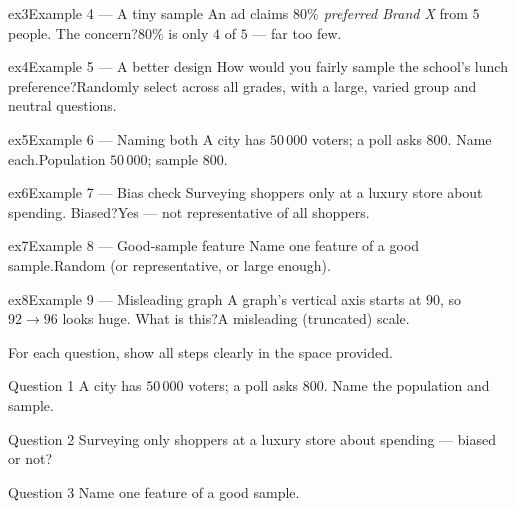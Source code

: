 \documentclass[11pt]{article}
\begin{document}
\begin{example}{ex3}{Example 4 --- A tiny sample}
An ad claims \emph{$80\%$ preferred Brand X} from $5$ people. The concern?\soln $80\%$ is only $4$ of $5$ — far too few.
\end{example}

\begin{example}{ex4}{Example 5 --- A better design}
How would you fairly sample the school's lunch preference?\soln Randomly select across all grades, with a large, varied group and neutral questions.
\end{example}

\begin{example}{ex5}{Example 6 --- Naming both}
A city has $50\,000$ voters; a poll asks $800$. Name each.\soln Population $50\,000$; sample $800$.
\end{example}

\begin{example}{ex6}{Example 7 --- Bias check}
Surveying shoppers only at a luxury store about spending. Biased?\soln Yes — not representative of all shoppers.
\end{example}

\begin{example}{ex7}{Example 8 --- Good-sample feature}
Name one feature of a good sample.\soln Random (or representative, or large enough).
\end{example}

\begin{example}{ex8}{Example 9 --- Misleading graph}
A graph's vertical axis starts at $90$, so $92\to96$ looks huge. What is this?\soln A misleading (truncated) scale.
\end{example}

\clearpage
{}
For each question, show all steps clearly in the space provided.

\begin{qbox}{Question 1}
A city has $50\,000$ voters; a poll asks $800$. Name the population and sample.\workspace{2.4cm}
\end{qbox}

\begin{qbox}{Question 2}
Surveying only shoppers at a luxury store about spending — biased or not?\workspace{2.4cm}
\end{qbox}

\begin{qbox}{Question 3}
Name one feature of a good sample.\workspace{2.4cm}
\end{qbox}
\end{document}

